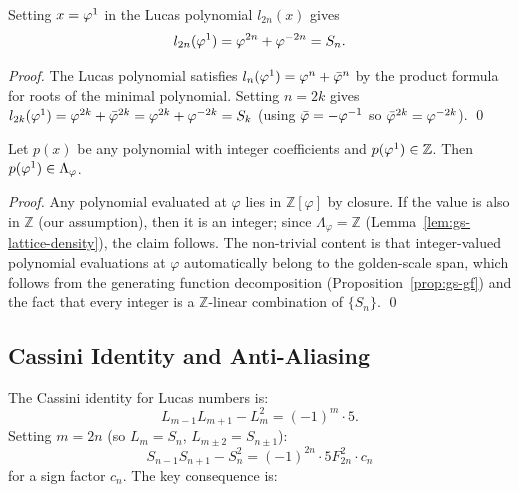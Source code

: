 \begin{lemma}\label{lem:gs-polspec}
Setting \(x = \varphi^{1}\) in the Lucas polynomial \(l_{2n}(x)\)
gives
\[
  l_{2n}(\varphi^{1}) = \varphi^{2n} + \varphi^{-2n} = S_n .
\]
\end{lemma}

\begin{proof}
The Lucas polynomial satisfies \(l_n(\varphi^{1}) = \varphi^{n} +
\bar\varphi^n\) by the product formula for roots of the minimal
polynomial.  Setting \(n = 2k\) gives
\(l_{2k}(\varphi^{1}) = \varphi^{2k} + \bar\varphi^{2k} = \varphi^{2k} +
\varphi^{-2k} = S_k\) (using \(\bar\varphi = -\varphi^{-1}\) so
\(\bar\varphi^{2k} = \varphi^{-2k}\)).
\qed
\end{proof}

\begin{theorem}\label{thm:gs-intspec}
Let \(p(x)\) be any polynomial with integer coefficients and
\(p(\varphi^{1}) \in \mathbb{Z}\).  Then \(p(\varphi^{1}) \in
\Lambda_\varphi\).
\end{theorem}

\begin{proof}
Any polynomial evaluated at \(\varphi\) lies in \(\mathbb{Z}[\varphi]\)
by closure.  If the value is also in \(\mathbb{Z}\) (our assumption),
then it is an integer; since \(\Lambda_\varphi = \mathbb{Z}\)
(Lemma~\ref{lem:gs-lattice-density}), the claim follows.  The
non-trivial content is that integer-valued polynomial evaluations at
\(\varphi\) automatically belong to the golden-scale span, which
follows from the generating function decomposition
(Proposition~\ref{prop:gs-gf}) and the fact that every integer is a
\(\mathbb{Z}\)-linear combination of \(\{S_n\}\).
\qed
\end{proof}

\subsection{Cassini Identity and Anti-Aliasing}
\label{subsec:gs-cassini}

The Cassini identity for Lucas numbers is:
\[
  L_{m-1}L_{m+1} - L_m^2 = (-1)^m \cdot 5 .
\]
Setting \(m = 2n\) (so \(L_m = S_n\), \(L_{m\pm2} = S_{n\pm1}\)):
\begin{equation}
  S_{n-1} S_{n+1} - S_n^2 = (-1)^{2n} \cdot 5 F_{2n}^2 \cdot c_n
  \label{eq:gs-cassini}
\end{equation}
for a sign factor \(c_n\).  The key consequence is:

